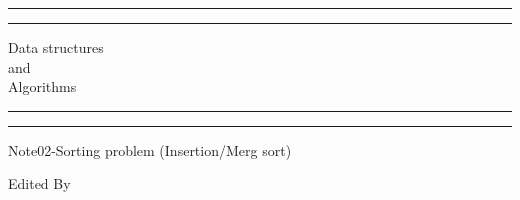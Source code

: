 \documentclass[a4paper, 11pt, oneside]{book} %
\begin{document}
 

\begin{titlepage} %

	\centering %
	
	\scshape %
	
	\vspace*{\baselineskip} %
	
	
	\rule{\textwidth}{1.6pt}\vspace*{-\baselineskip}\vspace*{2pt} %
	\rule{\textwidth}{0.4pt} %
	
	\vspace{0.75\baselineskip} %
	
	{\LARGE Data structures\\ and\\ Algorithms\\} %
	
	\vspace{0.75\baselineskip} %
	
	\rule{\textwidth}{0.4pt}\vspace*{-\baselineskip}\vspace{3.2pt} %
	\rule{\textwidth}{1.6pt} %
	
	\vspace{2\baselineskip} %
	
	
	Note02-Sorting problem (Insertion/Merg sort)%
	
	\vspace*{3\baselineskip} %
	
	
	Edited By
	
	\vspace{0.5\baselineskip} %
	

\end{titlepage}
\end{document}
